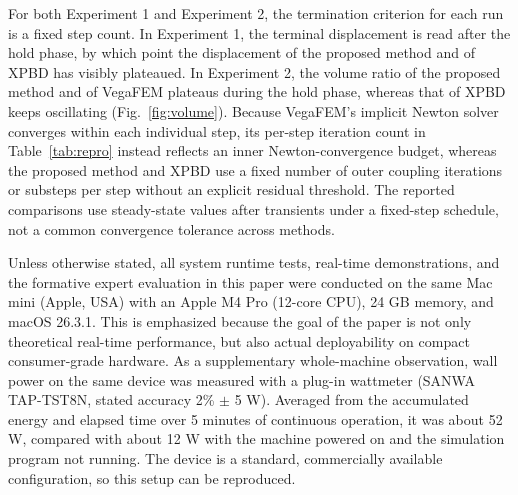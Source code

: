 \documentclass{ieeeaccess}
\begin{document}
For both Experiment 1 and Experiment 2, the termination criterion for each run is a fixed step count. In Experiment 1, the terminal displacement is read after the hold phase, by which point the displacement of the proposed method and of XPBD has visibly plateaued. In Experiment 2, the volume ratio of the proposed method and of VegaFEM plateaus during the hold phase, whereas that of XPBD keeps oscillating (Fig.~\ref{fig:volume}). Because VegaFEM's implicit Newton solver converges within each individual step, its per-step iteration count in Table~\ref{tab:repro} instead reflects an inner Newton-convergence budget, whereas the proposed method and XPBD use a fixed number of outer coupling iterations or substeps per step without an explicit residual threshold. The reported comparisons use steady-state values after transients under a fixed-step schedule, not a common convergence tolerance across methods.

Unless otherwise stated, all system runtime tests, real-time demonstrations, and the formative expert evaluation in this paper were conducted on the same Mac mini (Apple, USA) with an Apple M4 Pro (12-core CPU), 24 GB memory, and macOS 26.3.1. This is emphasized because the goal of the paper is not only theoretical real-time performance, but also actual deployability on compact consumer-grade hardware. As a supplementary whole-machine observation, wall power on the same device was measured with a plug-in wattmeter (SANWA TAP-TST8N, stated accuracy 2\% $\pm$ 5 W). Averaged from the accumulated energy and elapsed time over 5 minutes of continuous operation, it was about 52 W, compared with about 12 W with the machine powered on and the simulation program not running. The device is a standard, commercially available configuration, so this setup can be reproduced.
\end{document}
